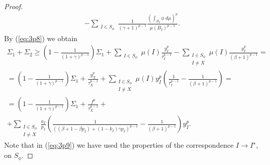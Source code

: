 \documentclass[10pt,a4paper]{amsart}
\begin{document}
\begin{proof}
\begin{multline}
-\sum_{\substack{I\in S_\phi}}\frac{1}{(\gamma+1)^{p-1}} \frac{\left( \int_{B_I}\phi\; d\mu \right)^p}{\mu(B_I)^{p-1}}.
\end{multline}
By (\ref{eq:3p8}) we obtain
\begin{multline} \label{eq:3p9}
\Sigma_1+\Sigma_2\geq \left(1-\frac{1}{(1+\gamma)^{p-1}} \right)\Sigma_1+\sum_{\substack{I\in S_\phi}}\mu(I) \frac{y_I^p}{\tau_I^{p-1}}-\sum_{\substack{I\in S_\phi \\ I\neq X}} \mu(I) \frac{y_I^p}{(\beta+1)^{p-1}}=\\
=\left(1-\frac{1}{(1+\gamma)^{p-1}} \right)\Sigma_1+\frac{y_X^p}{\tau_X^{p-1}}+\sum_{\substack{I\in S_\phi \\ I\neq X}}\mu(I) y_I^p \left( \frac{1}{\tau_I^{p-1}}-\frac{1}{(\beta+1)^{p-1}} \right)=\\
=\left(1-\frac{1}{(1+\gamma)^{p-1}} \right)\Sigma_1+\frac{f^p}{\tau_X^{p-1}}+\\
+\sum_{\substack{I\in S_\phi \\ I\neq X}} \frac{a_I}{p_I} \left( \frac{1}{\left((\beta +1-\beta p_I)+(1-k_I)\gamma p_I\right)^{p-1}} - \frac{1}{(\beta +1)^{p-1}} \right) y_I^p.
\end{multline}
Note that in (\ref{eq:3p9}) we have used the properties of the correspondence $I\longrightarrow I^{\star}$, on $S_{\phi}$.


\end{proof}
\end{document}
